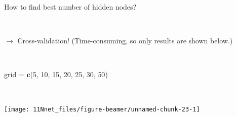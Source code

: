 \documentclass[10pt,ignorenonframetext,]{beamer}
\newenvironment{Shaded}{\begin{snugshade}}{\end{snugshade}}
\newcommand{\DecValTok}[1]{\textcolor[rgb]{0.00,0.00,0.81}{#1}}
\newcommand{\KeywordTok}[1]{\textcolor[rgb]{0.13,0.29,0.53}{\textbf{#1}}}
\newcommand{\NormalTok}[1]{#1}
\newcommand{\StringTok}[1]{\textcolor[rgb]{0.31,0.60,0.02}{#1}}
\begin{document}
\begin{frame}[fragile]

\begin{block}{How to find best number of hidden nodes?}

\(~\)

\(\rightarrow\) Cross-validation! (Time-consuming, so only results are
shown below.)

\(~\)

\scriptsize

\begin{Shaded}
\begin{Highlighting}[]
\NormalTok{grid =}\StringTok{ }\KeywordTok{c}\NormalTok{(}\DecValTok{5}\NormalTok{, }\DecValTok{10}\NormalTok{, }\DecValTok{15}\NormalTok{, }\DecValTok{20}\NormalTok{, }\DecValTok{25}\NormalTok{, }\DecValTok{30}\NormalTok{, }\DecValTok{50}\NormalTok{)}
\end{Highlighting}
\end{Shaded}

\(~\)

\center

\texttt{[image: 11Nnet\_files/figure-beamer/unnamed-chunk-23-1]}

\end{block}

\end{frame}
\end{document}
